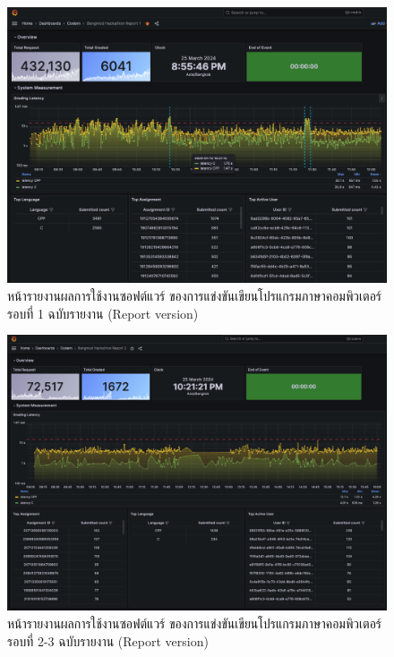 \documentclass[12pt,one side,openright,a4paper]{cpe-thesis-th}
\begin{document}
\begin{figure}[H]
  \centering
  \includegraphics[width=12cm]{figure/results/grafana/grafana-bmh1-report.png}
  \caption[หน้ารายงานผลการใช้งานซอฟต์แวร์ ของการแข่งขันเขียนโปรแกรมภาษาคอมพิวเตอร์รอบที่ 1 ฉบับรายงาน]{หน้ารายงานผลการใช้งานซอฟต์แวร์ ของการแข่งขันเขียนโปรแกรมภาษาคอมพิวเตอร์รอบที่ 1 ฉบับรายงาน (Report version)}
  \label{fig:res-grafana-bmh1-report}
\end{figure}

\begin{figure}[H]
  \centering
  \includegraphics[width=12cm]{figure/results/grafana/grafana-bmh2-report.png}
  \caption[หน้ารายงานผลการใช้งานซอฟต์แวร์ ของการแข่งขันเขียนโปรแกรมภาษาคอมพิวเตอร์รอบที่ 2-3 ฉบับรายงาน]{หน้ารายงานผลการใช้งานซอฟต์แวร์ ของการแข่งขันเขียนโปรแกรมภาษาคอมพิวเตอร์รอบที่ 2-3 ฉบับรายงาน (Report version)}
  \label{fig:res-grafana-bmh2-report}
\end{figure}
\end{document}
